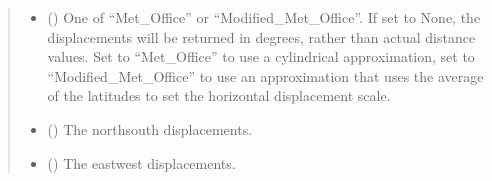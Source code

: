 \documentclass[letterpaper,10pt,english]{sphinxmanual}
\begin{document}
\begin{fulllineitems}
\begin{quote}
\begin{description}
\begin{itemize}
\item {}
\sphinxAtStartPar
{} () \textendash{} One of “Met\_Office” or “Modified\_Met\_Office”. If set to None, the
displacements will be returned in degrees, rather than actual distance
values. Set to “Met\_Office” to use a cylindrical approximation, set
to “Modified\_Met\_Office” to use an approximation that uses the average
of the latitudes to set the horizontal displacement scale.

\end{itemize}

\sphinxAtStartPar
{}

\sphinxAtStartPar
\begin{itemize}
\item {}
\sphinxAtStartPar
{} () \textendash{} The north\sphinxhyphen{}south displacements.

\item {}
\sphinxAtStartPar
{} () \textendash{} The east\sphinxhyphen{}west displacements.

\end{itemize}


\end{description}\end{quote}

\end{fulllineitems}

\end{document}

